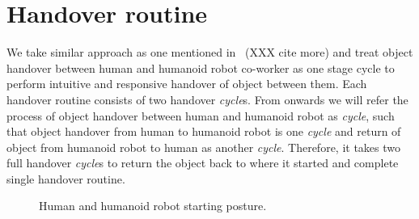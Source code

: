 \documentclass[a4paper, 12pt, oneside]{Thesis}  %
\begin{document}
\clearpage
\section{Handover routine}\label{handover routine}

We take similar approach as one mentioned in~\cite{medina2016human, nemlekarprompt} (XXX cite more) and treat object handover between human and humanoid robot co-worker as one stage cycle to perform intuitive and responsive handover of object between them. Each handover routine consists of two handover \textit{cycle}s. From onwards we will refer the process of object handover between human and humanoid robot as \textit{cycle}, such that object handover from human to humanoid robot is one \textit{cycle} and return of object from humanoid robot to human as another \textit {cycle}. Therefore, it takes two full handover \textit{cycle}s to return the object back to where it started and complete single handover routine.
\begin{figure}[htbp]
		\caption{Human and humanoid robot starting posture.}
		\label{fig:halfsit}
\end{figure}
\end{document}
